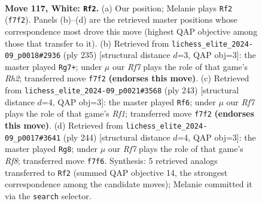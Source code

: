 \documentclass[11pt]{article}
\begin{document}
\clearpage

\begin{figure}[p]\centering
\begin{subfigure}{0.46\textwidth}\centering
\resizebox{\linewidth}{!}{%
\newchessgame
\chessboard[
  setfen={8/5R2/3k4/6K1/6P1/1r6/8/4N3 w - - 17 117},
  showmover=false,
  pgfstyle=straightmove, color=movearrow, markmove={f7-f2}
]}
\caption{}
\end{subfigure}\hfill
\begin{subfigure}{0.46\textwidth}\centering
\resizebox{\linewidth}{!}{%
\newchessgame
\chessboard[
  setfen={8/7r/1R6/8/5p2/5k2/8/6K1 b - - 35 118},
  showmover=false,
  pgfstyle=straightmove, color=movearrow, markmove={h7-g7}
]}
\caption{}
\end{subfigure}
\\[4pt]
\begin{subfigure}{0.46\textwidth}\centering
\resizebox{\linewidth}{!}{%
\newchessgame
\chessboard[
  setfen={5r2/8/8/8/8/6R1/4K2p/7k b - - 35 122},
  showmover=false,
  pgfstyle=straightmove, color=movearrow, markmove={f8-f6}
]}
\caption{}
\end{subfigure}\hfill
\begin{subfigure}{0.46\textwidth}\centering
\resizebox{\linewidth}{!}{%
\newchessgame
\chessboard[
  setfen={5R2/7K/7P/4k3/8/8/6r1/8 w - - 53 123},
  showmover=false,
  pgfstyle=straightmove, color=movearrow, markmove={f8-g8}
]}
\caption{}
\end{subfigure}
\caption{\textbf{Move 117, White: \texttt{Rf2}.} (a) Our position; Melanie plays \texttt{Rf2} (\texttt{f7f2}). Panels (b)--(d) are the retrieved master positions whose correspondence most drove this move (highest QAP objective among those that transfer to it). (b) Retrieved from \texttt{lichess\_elite\_2024-09\_p0018\#2936} (ply 235) [structural distance $d$=3, QAP obj=3]: the master played \texttt{Rg7+}; under $\mu$ our \emph{Rf7} plays the role of that game's \emph{Rh2}; transferred move \texttt{f7f2} \textbf{(endorses this move)}. (c) Retrieved from \texttt{lichess\_elite\_2024-09\_p0021\#3568} (ply 243) [structural distance $d$=4, QAP obj=3]: the master played \texttt{Rf6}; under $\mu$ our \emph{Rf7} plays the role of that game's \emph{Rf1}; transferred move \texttt{f7f2} \textbf{(endorses this move)}. (d) Retrieved from \texttt{lichess\_elite\_2024-09\_p0017\#3641} (ply 244) [structural distance $d$=4, QAP obj=3]: the master played \texttt{Rg8}; under $\mu$ our \emph{Rf7} plays the role of that game's \emph{Rf8}; transferred move \texttt{f7f6}. Synthesis: 5 retrieved analogs transferred to \texttt{Rf2} (summed QAP objective 14, the strongest correspondence among the candidate moves); Melanie committed it via the \texttt{search} selector.}
\label{fig:thought-m232}
\end{figure}
\end{document}
